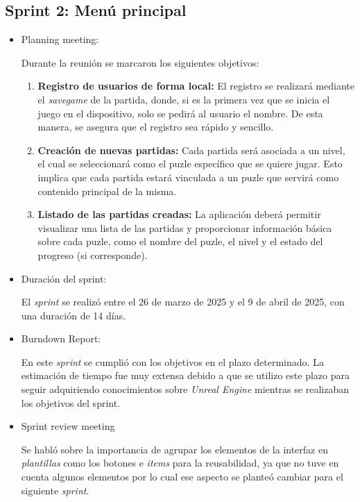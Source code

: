 \subsection{\textbf{Sprint 2: Menú principal } }
\begin{itemize}
    \item {Planning meeting:}
    
    Durante la reunión se marcaron los siguientes objetivos:
    \begin{enumerate}
        \item \textbf{Registro de usuarios de forma local:} El registro se realizará mediante el \textit{savegame} de la partida, donde, si es la primera vez que se inicia el juego en el dispositivo, solo se pedirá al usuario el nombre. De esta manera, se asegura que el registro sea rápido y sencillo. 
    
        \item \textbf{Creación de nuevas partidas:} Cada partida será asociada a un nivel, el cual se seleccionará como el puzle específico que se quiere jugar. Esto implica que cada partida estará vinculada a un puzle que servirá como contenido principal de la misma. 
    
        \item \textbf{Listado de las partidas creadas:} La aplicación deberá permitir visualizar una lista de las partidas y proporcionar información básica sobre cada puzle, como el nombre del puzle, el nivel y el estado del progreso (si corresponde). 
    \end{enumerate}
    
    
        \item Duración del sprint:
    
    El \textit{sprint } se realizó entre el 26 de marzo de 2025 y el 9 de abril de 2025, con una duración de 14 días.
    
    
        \item {Burndown Report:}
    
    En este \textit{sprint} se cumplió con los objetivos en el plazo determinado. La estimación de tiempo fue muy extensa debido a que se utilizo este plazo para seguir adquiriendo conocimientos sobre \textit{Unreal Engine} mientras se realizaban los objetivos del sprint.
    
    
    
    \item {Sprint review meeting}
    
    Se habló sobre la importancia de agrupar los elementos de la interfaz en \textit{plantillas} como los botones e \textit{items} para la reusabilidad, ya que no tuve en cuenta algunos elementos por lo cual ese aspecto se planteó cambiar para el siguiente \textit{sprint}.
\end{itemize}

